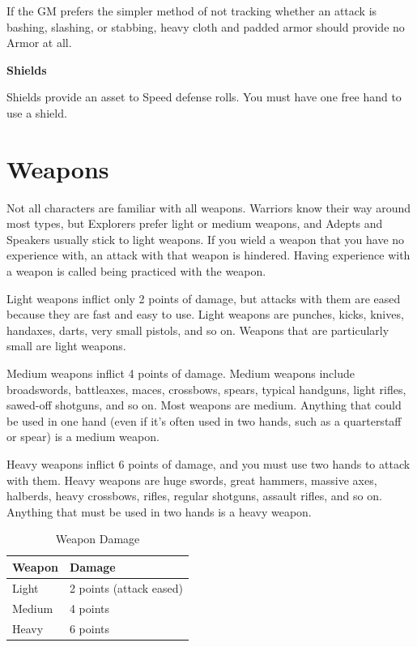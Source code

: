 \begin{multicols}{2}

If the GM prefers the simpler method of not tracking whether an attack is bashing, slashing, or stabbing, heavy cloth and padded armor should provide no Armor at all.

\textbf{Shields}

Shields provide an asset to Speed defense rolls. You must have one free hand to use a shield.

\section{Weapons}

Not all characters are familiar with all weapons. Warriors know their way around most types, but Explorers prefer light or medium weapons, and Adepts and Speakers usually stick to light weapons. If you wield a weapon that you have no experience with, an attack with that weapon is hindered. Having experience with a weapon is called being practiced with the weapon.

Light weapons inflict only 2 points of damage, but attacks with them are eased because they are fast and easy to use. Light weapons are punches, kicks, knives, handaxes, darts, very small pistols, and so on. Weapons that are particularly small are light weapons.

Medium weapons inflict 4 points of damage. Medium weapons include broadswords, battleaxes, maces, crossbows, spears, typical handguns, light rifles, sawed-off shotguns, and so on. Most weapons are medium. Anything that could be used in one hand (even if it’s often used in two hands, such as a quarterstaff or spear) is a medium weapon.

Heavy weapons inflict 6 points of damage, and you must use two hands to attack with them. Heavy weapons are huge swords, great hammers, massive axes, halberds, heavy crossbows, rifles, regular shotguns, assault rifles, and so on. Anything that must be used in two hands is a heavy weapon.

\end{multicols}

\begin{table}[h]
\centering
\caption{Weapon Damage}
\label{tab:Weapon Damage}
\begin{tabularx}{0.5\textwidth} { | Y | Y | }
\hline
\textbf{Weapon} & \textbf{Damage} \\ \hline
Light & 2 points (attack eased)\\ \hline
Medium & 4 points \\ \hline
Heavy & 6 points \\ \hline
\end{tabularx}
\end{table}


